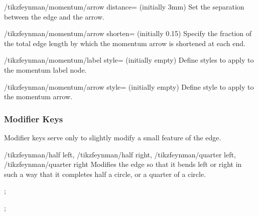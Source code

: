 \documentclass[a4paper,final]{ltxdoc}
\begin{document}
\begin{codeexample}[execute code=false]
\begin{keylist}
\begin{key}{/tikzfeynman/momentum/arrow distance= (initially 3mm)}
  Set the separation between the edge and the arrow.
\end{key}

\begin{key}{/tikzfeynman/momentum/arrow shorten= (initially 0.15)}
  Specify the fraction of the total edge length by which the momentum arrow is
  shortened at each end.
\end{key}

\begin{key}{/tikzfeynman/momentum/label style= (initially \normalfont empty)}
  Define styles to apply to the momentum label node.
\end{key}

\begin{key}{/tikzfeynman/momentum/arrow style= (initially \normalfont empty)}
  Define style to apply to the momentum arrow.
\end{key}
\end{keylist}

\subsubsection{Modifier Keys}
\label{subsubsec:modifier_keys}

Modifier keys serve only to slightly modify a small feature of the edge.

\begin{keylist}{%
    /tikzfeynman/half left,
    /tikzfeynman/half right,
    /tikzfeynman/quarter left,
    /tikzfeynman/quarter right}
  Modifies the edge so that it bends left or right in such a way that it
  completes half a circle, or a quarter of a circle.

\begin{codeexample}[]
;
\end{codeexample}

\begin{codeexample}[]
;
\end{codeexample}
\end{keylist}


\end{codeexample}
\end{document}

